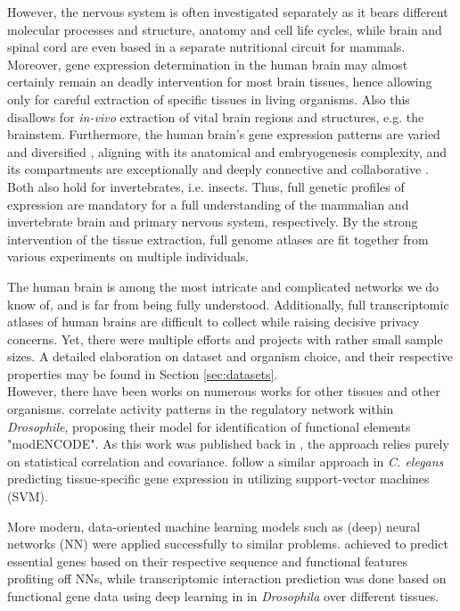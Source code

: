 \documentclass[]{article}
\renewcommand{\cite}{\citep}
\begin{document}
However, the nervous system is often investigated separately as it bears different molecular processes and structure, anatomy and cell life cycles, while brain and spinal cord are even based in a separate nutritional circuit for mammals. Moreover, gene expression determination in the human brain may almost certainly remain an deadly intervention for most brain tissues, hence allowing only for careful extraction of specific tissues in living organisms. Also this disallows for \textit{in-vivo} extraction of vital brain regions and structures, e.g. the brainstem. Furthermore, the human brain's gene expression patterns are varied and diversified \cite{ramasamy2014genetic}, aligning with its anatomical and embryogenesis complexity, and its compartments are exceptionally and deeply connective and collaborative \cite{fornito2015connectomics}. Both also hold for invertebrates, i.e. insects. Thus, full genetic profiles of expression are mandatory for a full understanding of the mammalian and invertebrate brain and primary nervous system, respectively. By the strong intervention of the tissue extraction, full genome atlases are fit together from various experiments on multiple individuals.

The human brain is among the most intricate and complicated networks we do know of, and is far from being fully understood. Additionally, full transcriptomic atlases of human brains are difficult to collect while raising decisive privacy concerns. Yet, there were multiple efforts and projects with rather small sample sizes. A detailed elaboration on dataset and organism choice, and their respective properties may be found in Section \ref{sec:datasets}. \\

However, there have been works on numerous works for other tissues and other organisms. \citet{modencode2010identification} correlate activity patterns in the regulatory network within \textit{Drosophile}, proposing their model for identification of functional elements "modENCODE". As this work was published back in \citeyear{modencode2010identification}, the approach relies purely on statistical correlation and covariance. \citet{chikina2009global} follow a similar approach in \textit{C. elegans} predicting tissue-specific gene expression in \citeyear{noble2006support} utilizing support-vector machines (SVM)\cite{noble2006support}. 

More modern, data-oriented machine learning models such as (deep) neural networks (NN) were applied successfully to similar problems. \citet{aromolaran2020essential} achieved to predict essential genes based on their respective sequence and functional features profiting off NNs, while transcriptomic interaction prediction was done based on functional gene data using deep learning in \citet{yang2019predicting} in \textit{Drosophila} over different tissues. 
\end{document}
